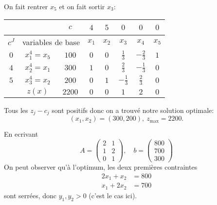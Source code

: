 {\begin{td-sol}[]
\begin{enumerate}
			On fait rentrer \(x_5\) et on fait sortir \(x_3\):
			\begin{center}
				\begin{tabular}{|ccc|ccccc|} %
					\hline  %
					\, & \, &\(c\)&\(4\)&\(5\)&\(0\)&\(0\)&\(0\)\\
					\hline %
					\multicolumn{1}{|c|}{\(c^J\)}& \multicolumn{2}{c|}{variables de base}&\(x_1\)&\(x_2\)&\(x_3\)&\(x_4\)&\(x_5\)\\
					\hline %
					\multicolumn{1}{|c|}{\(0\)}& \multicolumn{1}{c|}{\(x_1^{4}=x_5\)}&\(100\)&\(0\)&\(0\)&\(\frac13\)&\(-\frac23\)&\(1\)\\
					\hline %
					\multicolumn{1}{|c|}{\(4\)}& \multicolumn{1}{c|}{\(x_2^{4}=x_1\)}&\(300\)&\(1\)&\(0\)&\(\frac23\)&\(-\frac13\)&\(0\)\\
					\hline %
					\multicolumn{1}{|c|}{\(5\)}& \multicolumn{1}{c|}{\(x_3^{4}=x_2\)}&\(200\)&\(0\)&\(1\)&\(-\frac13\)&\(\frac23\)&\(0\)\\
					\hline %
					\multicolumn{1}{|c|}{} &\(z(x)\)            & \multicolumn{1}{|c|}{\(2200\)}&\(0\)&\(0\)&\(1\)&\(2\)&\(0\)\\
					\hline %
				\end{tabular}
			\end{center}
			Tous les \(z_j-c_j\) sont positifs donc on a trouvé notre solution optimale:
			\begin{equation*}
				(x_1,x_2) = (300,200),\ z_{\max} = 2200.
			\end{equation*}

			En ecrivant 
			\begin{equation*}
				A = \begin{pmatrix}
					2 & 1\\
					1 & 2\\
					0 & 1
				\end{pmatrix},\quad b = \begin{pmatrix}
					800\\
					700\\
					300
				\end{pmatrix}
			\end{equation*}
			On peut observer qu'à l'optimum, les deux premières contraintes
			\begin{equation*}
				\begin{aligned}
					2x_1 + x_2 &= 800\\
					x_1 + 2x_2 &= 700
				\end{aligned}
			\end{equation*}
			sont serrées, donc \(y_1, y_2 > 0\) (c'est le cas ici).


\end{enumerate}
\end{td-sol}}
